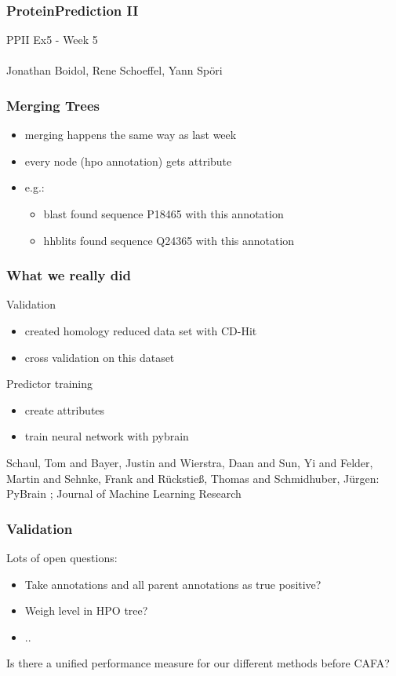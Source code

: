\documentclass{beamer}
\begin{document}
\begin{frame}
 \frametitle{ProteinPrediction II}
 PPII Ex5 - Week 5\\
 \hfill \\
 Jonathan Boidol, Rene Schoeffel, Yann Sp\"ori
\end{frame}

\begin{frame}[fragile]
  \frametitle{Merging Trees}
  
  \begin{itemize}
  	\item merging happens the same way as last week
  	\item every node (hpo annotation) gets attribute
  	\item[] e.g.: 
  		\begin{itemize}
  			\item blast found sequence P18465 with this annotation\\
			\item hhblits found sequence Q24365 with this annotation
		\end{itemize}
  	
  \end{itemize}
\end{frame}

\begin{frame}
 \frametitle{What we really did}
	Validation 
 	\begin{itemize}
 		\item created homology reduced data set with CD-Hit
 		\item cross validation on this dataset
 	\end{itemize}
 	Predictor training
 	\begin{itemize}
 		\item create attributes
 		\item train neural network with pybrain
 	\end{itemize}
{\tiny
Schaul, Tom and Bayer, Justin and Wierstra, Daan and Sun, Yi and Felder, Martin and Sehnke, Frank and R{\"u}ckstie{\ss}, Thomas and Schmidhuber, J{\"u}rgen: PyBrain ; Journal of Machine Learning Research
}
 

\end{frame}

\begin{frame}
 \frametitle{Validation}
	Lots of open questions:
	\begin{itemize}
		\item Take annotations and all parent annotations as true positive?
		\item Weigh level in HPO tree?
		\item ..
	\end{itemize}
	
	Is there a unified performance measure for our different methods before CAFA?

\end{frame}
\end{document}
